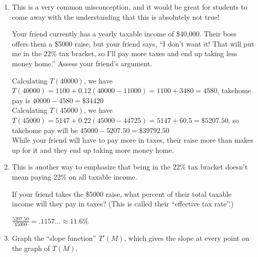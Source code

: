 \documentclass{article}
\begin{document}
\begin{enumerate}
\begin{enumerate}
  \item

    \begin{workshop}
      This is a very common misconception, and it would be great for students to come away with the understanding that this is absolutely not true! 
    \end{workshop}

    \begin{problem}[\stretch{0.75}]
      Your friend currently has a yearly taxable income of \$40,000. Their boss offers them a \$5000 raise, but your friend says, ``I don't want it! That will put me in the 22\% tax bracket, so I'll pay more taxes and end up taking less money home.'' Assess your friend's argument.
    \end{problem}

    \begin{solution}
        Calculating $T(40000)$, we have $T(40000)=1100+0.12(40000-11000)=1100+3480=4580$, takehome pay is $40000-4580=\$34420$\\
        Calculating $T(45000)$, we have $T(45000)=5147+0.22(45000-44725)=5147+60.5=\$5207.50$, so takehome pay will be $45000-5207.50=\$39792.50$\\
        While your friend will have to pay more in taxes, their raise more than makes up for it and they end up taking more money home.
    \end{solution}

  \item

    \begin{workshop}
      This is another way to emphasize that being in the 22\% tax bracket doesn't mean paying 22\% on all taxable income.
    \end{workshop}

    \begin{problem}[\stretch{0.3}]
      If your friend takes the \$5000 raise, what percent of their total taxable income will they pay in taxes? (This is called their ``effective tax rate''.)
    \end{problem}

    \begin{solution}
        $\frac{5207.50}{45000}=.1157\hdots\approx 11.6\%$
    \end{solution}
    
  \item
    \begin{problem}[\stretch{0.8}]
      Graph the ``slope function'' $T'(M)$, which gives the slope at every
      point on the graph of $T(M)$. 
    \end{problem}


\end{enumerate}
\end{enumerate}
\end{document}
